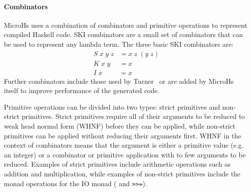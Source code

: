 \paragraph{Combinators}
MicroHs uses a combination of combinators and primitive operations to represent compiled Haskell code. SKI combinators are a small set of combinators that can be used to represent any lambda term. The three basic SKI combinators are:
\begin{align*}
    S \; x \; y \; z & = x \; z \; (y \; z) \\
    K \; x \; y      & = x \\
    I \; x           & = x
\end{align*}
Further combinators include those used by Turner~\cite{turner} or are added by MicroHs itself to improve performance of the generated code. 

Primitive operations can be divided into two types: strict primitives and non-strict primitives. Strict primitives require all of their arguments to be reduced to weak head normal form (WHNF) before they can be applied, while non-strict primitives can be applied without reducing their arguments first. WHNF in the context of combinators means that the argument is either a primitive value (e.g. an integer) or a combinator or primitive application with to few arguments to be reduced. Examples of strict primitives include arithmetic operations such as addition and multiplication, while examples of non-strict primitives include the monad operations for the IO monad ( and \texttt{>>=}).

